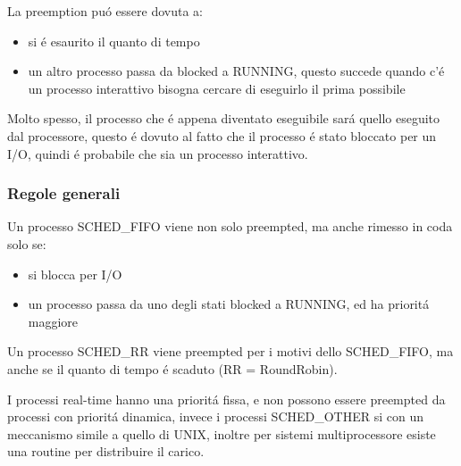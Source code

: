     La preemption puó essere dovuta a:
    \begin{itemize}
        \item si é esaurito il quanto di tempo
        \item un altro processo passa da blocked a RUNNING, questo succede quando c'é un processo interattivo bisogna cercare di eseguirlo il prima possibile
    \end{itemize}
    Molto spesso, il processo che é appena diventato eseguibile sará quello eseguito dal processore, questo é dovuto al fatto
    che il processo é stato bloccato per un I/O, quindi é probabile che sia un processo interattivo.
    \subsubsection*{Regole generali}
    Un processo SCHED\_FIFO viene non solo preempted, ma anche rimesso in coda solo se:
    \begin{itemize}
        \item si blocca per I/O
        \item un processo passa da uno degli stati blocked a RUNNING, ed ha prioritá maggiore
        \end{itemize}
    Un processo SCHED\_RR viene preempted per i motivi dello SCHED\_FIFO, ma anche se il quanto di tempo é scaduto (RR = RoundRobin).


    I processi real-time hanno una prioritá fissa, e non possono essere preempted da processi con prioritá dinamica, invece i
    processi SCHED\_OTHER si con un meccanismo simile a quello di UNIX, inoltre per sistemi multiprocessore esiste una
    routine per distribuire il carico.